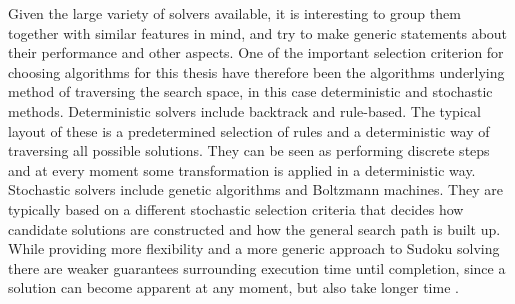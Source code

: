 \documentclass[a4paper,11pt]{kth-mag}
\begin{document}
Given the large variety of solvers available, it is interesting to group them together with similar features in mind, and try to make generic statements about their performance and other aspects.
One of the important selection criterion for choosing algorithms for this thesis have therefore been the algorithms underlying method of traversing the search space, in this case deterministic and stochastic methods.
Deterministic solvers include backtrack and rule-based.
The typical layout of these is a predetermined selection of rules and a deterministic way of traversing all possible solutions.
They can be seen as performing discrete steps and at every moment some transformation is applied in a deterministic way.
Stochastic solvers include genetic algorithms and Boltzmann machines.
They are typically based on a different stochastic selection criteria that decides how candidate solutions are constructed and how the general search path is built up.
While providing more flexibility and a more generic approach to Sudoku solving there are weaker guarantees surrounding execution time until completion, since a solution can become apparent at any moment, but also take longer time \cite{stochastic}.

\FloatBarrier
\end{document}
